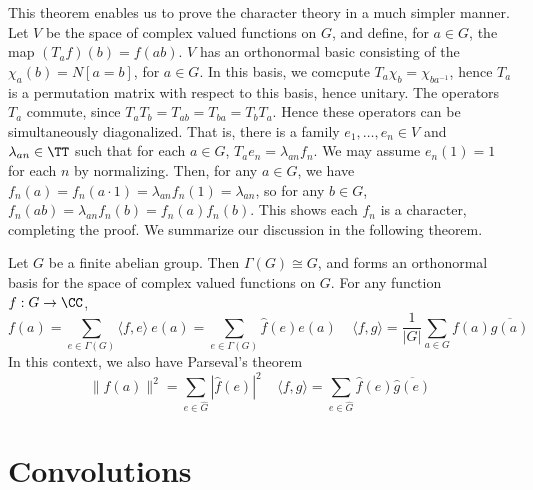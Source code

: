 This theorem enables us to prove the character theory in a much simpler manner. Let $V$ be the space of complex valued functions on $G$, and define, for $a \in G$, the map $(T_a f)(b) = f(ab)$. $V$ has an orthonormal basic consisting of the $\chi_a(b) = N [a = b]$, for $a \in G$. In this basis, we comcpute $T_a \chi_b = \chi_{ba^{-1}}$, hence $T_a$ is a permutation matrix with respect to this basis, hence unitary. The operators $T_a$ commute, since $T_aT_b = T_{ab} = T_{ba} = T_b T_a$. Hence these operators can be simultaneously diagonalized. That is, there is a family $e_1, \dots, e_n \in V$ and $\lambda_{an} \in \TT$ such that for each $a \in G$, $T_a e_n = \lambda_{an} f_n$. We may assume $e_n(1) = 1$ for each $n$ by normalizing. Then, for any $a \in G$, we have $f_n(a) = f_n(a \cdot 1) = \lambda_{an} f_n(1) = \lambda_{an}$, so for any $b \in G$, $f_n(ab) = \lambda_{an} f_n(b) = f_n(a) f_n(b)$. This shows each $f_n$ is a character, completing the proof. We summarize our discussion in the following theorem.

\begin{theorem}
    Let $G$ be a finite abelian group. Then $\Gamma(G) \cong G$, and forms an orthonormal basis for the space of complex valued functions on $G$. For any function $f: G \to \CC$,
    \[ f(a) = \sum_{e \in \Gamma(G)} \langle f, e \rangle\ e(a) = \sum_{e \in \Gamma(G)} \hat{f}(e) e(a)\ \ \ \ \ \langle f, g \rangle = \frac{1}{|G|} \sum_{a \in G} f(a) \overline{g(a)} \]
    In this context, we also have Parseval's theorem
    \[ \| f(a) \|^2 = \sum_{e \in \hat{G}} |\widehat{f}(e)|^2\ \ \ \ \ \langle f, g \rangle = \sum_{e \in \hat{G}} \widehat{f}(e) \overline{\widehat{g}(e)} \]
\end{theorem}

\section{Convolutions}

